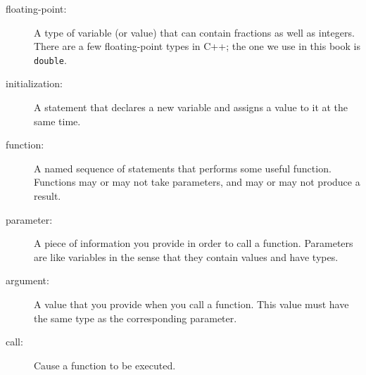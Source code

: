 \begin{description}

\item[floating-point:] A type of variable (or value) that can contain
fractions as well as integers.  There are a few floating-point types
in C++; the one we use in this book is {\tt double}.

\item[initialization:]  A statement that declares a new variable
and assigns a value to it at the same time.

\item[function:]  A named sequence of statements that performs some
useful function.  Functions may or may not take parameters, and may
or may not produce a result.

\item[parameter:]  A piece of information you provide
in order to call a function.  Parameters are like variables in
the sense that they contain values and have types.

\item[argument:]  A value that you provide when you call a
function.  This value must have the same type as the corresponding
parameter.

\item[call:]  Cause a function to be executed.


\end{description}

